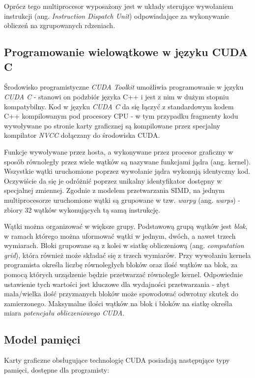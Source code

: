 \documentclass[12pt]{article}
\begin{document}
Oprócz tego multiprocesor wyposażony jest w układy sterujące wywołaniem instrukcji (ang. \textit{Instruction Dispatch Unit}) odpowiadające za wykonywanie obliczeń na zgrupowanych rdzeniach.

\subsection{Programowanie wielowątkowe w języku CUDA C}

Środowisko programistyczne \textit{CUDA Toolkit} umożliwia programowanie w języku \textit{CUDA C} - stanowi on podzbiór języka C++ i jest z nim w dużym stopniu kompatybilny. Kod w języku \textit{CUDA C} da się łączyć z standardowym kodem C++ kompilowanym pod procesory CPU - w tym przypadku fragmenty kodu wywoływane po stronie karty graficznej są kompilowane przez specjalny kompilator \textit{NVCC} dołączany do środowiska CUDA. 

Funkcje wywoływane przez hosta, a wykonywane przez procesor graficzny w sposób równoległy przez wiele wątków są nazywane funkcjami jądra (ang. kernel). Wszystkie wątki uruchomione poprzez wywołanie jądra wykonują identyczny kod. Oczywiście da się je odróżnić poprzez unikalny identyfikator dostępny w specjalnej zmiennej. Zgodnie z modelem przetwarzania SIMD, na jednym multiprocesorze uruchomione wątki są grupowane w tzw. \textit{warpy} (ang. \textit{warps}) - zbiory 32 wątków wykonujących tą samą instrukcję. 

Wątki można organizować w większe grupy. Podstawową grupą wątków jest \textit{blok}, w ramach którego można uformować wątki w jednym, dwóch, a nawet trzech wymiarach. Bloki grupowane są z kolei w siatkę obliczeniową (ang. \textit{computation grid}), która również może składać się z trzech wymiarów. Przy wywołaniu kernela programista określa liczbę równoległych bloków oraz ilość wątków na blok, za pomocą których urządzenie będzie przetwarzać równolegle kernel. Odpowiednie ustawienie tych wartości jest kluczowe dla wydajności przetwarzania - zbyt mała/wielka ilość przyznanych bloków może spowodować odwrotny skutek do zamierzonego. Maksymalne ilości wątków na blok i bloków na siatkę określa miara \textit{potencjału obliczeniowego CUDA}. 

\subsection{Model pamięci}

Karty graficzne obsługujące technologię CUDA posiadają następujące typy pamięci, dostępne dla programisty:
\end{document}
